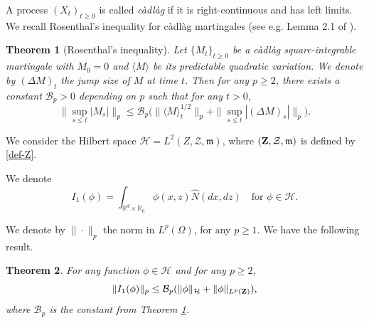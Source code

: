 \documentclass[12pt]{article}
\newtheorem{theorem}{Theorem}[section]
\def\cB{\mathcal{B}}
\def\cH{\mathcal{H}}
\def\cZ{\mathcal{Z}}
\def\bR{\mathbb{R}}
\newcommand{\fm}{\mathfrak{m}}
\begin{document}
\medskip



A process $(X_t)_{t\geq 0}$ is called {\em c\`adl\`ag} if it is right-continuous and has left limits.
We recall Rosenthal's inequality for c\`adl\`ag martingales (see e.g. Lemma 2.1 of \cite{DV90}). 

\begin{theorem}[Rosenthal's inequality]
\label{rosenthal}
Let $\{M_t\}_{t \geq 0}$ be a c\`adl\`ag square-integrable martingale with $M_0=0$ and $\langle M \rangle$ be its predictable quadratic variation. We denote by $(\Delta M)_t$ the jump size of $M$ at time $t$. Then for any $p \geq 2$, there exists a constant $\cB_p>0$ depending on $p$ such that for any $t>0$,
$$\|\sup_{s \leq t}|M_s|\|_p \leq \cB_p \Big(\| \langle M \rangle_t^{1/2}\|_p +\|\sup_{s \leq t}|(\Delta M)_s| \|_p\Big).$$
\end{theorem}

We consider the Hilbert space $\cH=L^2(Z,\cZ,\fm)$, where $({\bf Z},\cZ,\fm)$ is defined by \eqref{def-Z}.

We denote
\[
I_1(\phi)=%
\int_{\bR^{d} \times \bR_0}\phi(x,z)\widehat{N}(dx,dz) \quad \mbox{for $\phi \in \cH$}.
\]

We denote by $\|\cdot\|_p$ the norm in $L^p(\Omega)$, for any $p\geq 1$. We have the following result.

\begin{theorem}
\label{ros-I1}
For any function $\phi \in \cH$ and for any $p\geq 2$,
\begin{equation}
\label{mom-I1}
\|I_1(\phi)\|_p \leq \cB_p (\|\phi\|_{\cH}+\|\phi\|_{L^p({\bf Z})}),
\end{equation}
where $\cB_p$ is the constant from Theorem \ref{rosenthal}.
\end{theorem}
\end{document}
